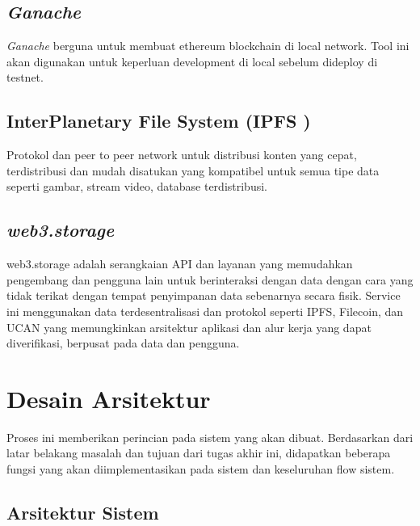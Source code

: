 \subsection{\emph{Ganache}}
\emph{Ganache} berguna untuk membuat ethereum blockchain di local network. Tool ini akan digunakan untuk
keperluan development di local sebelum dideploy di testnet.

\subsection{InterPlanetary File System (IPFS )}
Protokol dan peer to
peer network untuk distribusi konten yang cepat, terdistribusi
dan mudah disatukan yang kompatibel untuk semua tipe data
seperti gambar, stream video, database terdistribusi.

\subsection{\emph{web3.storage}}
web3.storage adalah serangkaian API dan layanan yang memudahkan pengembang dan pengguna lain untuk berinteraksi
dengan data dengan cara yang tidak terikat dengan tempat penyimpanan data sebenarnya secara fisik. Service ini menggunakan data terdesentralisasi dan protokol
seperti IPFS, Filecoin, dan UCAN yang memungkinkan arsitektur aplikasi dan alur kerja yang dapat diverifikasi, berpusat pada data dan pengguna.

\section{Desain Arsitektur}
Proses ini memberikan perincian pada sistem yang akan dibuat. Berdasarkan dari latar
belakang masalah dan tujuan dari tugas akhir ini, didapatkan beberapa fungsi yang akan
diimplementasikan pada sistem dan keseluruhan flow sistem.

\subsection{Arsitektur Sistem}

